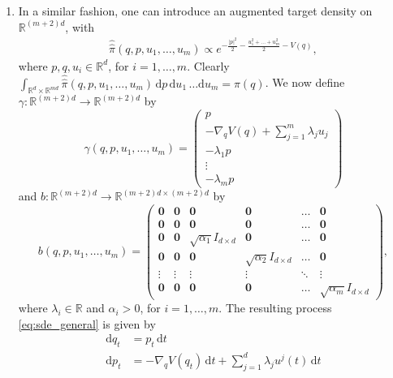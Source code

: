 \begin{enumerate}
  \item In a similar fashion, one can introduce an  augmented target density on $\mathbb{R}^{(m+2)d}$, with
  \begin{align*}
   \widehat{\widehat{\pi}}(q, p, u_1,\ldots, u_m) \propto e^{-\frac{|p|^2}{2} - \frac{u_1^2 + \ldots + u_m^2}{2}-V(q)},
  \end{align*}
  where $p, q, u_i \in \mathbb{R}^d$, for $i=1,\ldots, m$.  Clearly $\int_{\mathbb{R}^{d}\times \mathbb{R}^{md}} \widehat{\widehat{\pi}}(q, p, u_1,\ldots,u_m)\,\mathrm{d}p\,\mathrm{d}u_1\,\ldots \mathrm{d}u_m = \pi(q)$. We now define $\gamma:\mathbb{R}^{(m+2)d}\rightarrow \mathbb{R}^{(m+2)d}$ by
  $$
  \gamma(q,p, u_1,\ldots,u_m) = \left(\begin{array}{c}p \\ -\nabla_q V(q) + \sum_{j=1}^{m} \lambda_j u_j \\ -\lambda_1 p \\ \vdots \\ -\lambda_m p \end{array}\right) 
  $$
  and $b: \mathbb{R}^{(m+2)d}\rightarrow \mathbb{R}^{(m+2)d\times (m+2)d}$ by 
  $$
  b(q,p,u_1,\ldots, u_m) = \left(\begin{array}{cccccc}\boldsymbol{0} & \boldsymbol{0} & \boldsymbol{0} & \boldsymbol{0} & \ldots & \boldsymbol{0}\\ \boldsymbol{0} & \boldsymbol{0} & \boldsymbol{0} & \boldsymbol{0}& \ldots & \boldsymbol{0} \\ \boldsymbol{0} & \boldsymbol{0} & \sqrt{\alpha_1}I_{d\times d} & \boldsymbol{0} & \ldots & \boldsymbol{0} \\ \boldsymbol{0} & \boldsymbol{0} & \boldsymbol{0} & \sqrt{\alpha_2}I_{d\times d} & \ldots & \boldsymbol{0} \\ 
   \vdots & \vdots & \vdots & \vdots & \ddots & \vdots \\ \boldsymbol{0} & \boldsymbol{0} & \boldsymbol{0} &\boldsymbol{0} & \ldots & \sqrt{\alpha_m}I_{d\times d}\end{array}\right),
  $$
  where $\lambda_i \in \mathbb{R}$ and $\alpha_i > 0$, for $i=1,\ldots, m$.  The resulting process \eqref{eq:sde_general} is given by 
  \begin{equation}
  \label{eq:gle_markov}
  \begin{aligned}
    \mathrm{d}q_t &= p_t \,\mathrm{d}t \\ 
    \mathrm{d}p_t &= -\nabla_q V(q_t)\,\mathrm{d}t + \sum_{j=1}^{d}\lambda_j u^{j}(t)\,\mathrm{d}t \\

\end{aligned}
\end{equation}
\end{enumerate}
